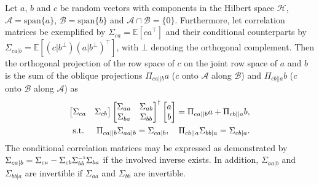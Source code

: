\begin{lem}\label{lem:oblique_projections}\citep[Lemma~1]{VanOverschee1994,Katayama1999} Let $a$, $b$ and $c$ be random vectors with components in the Hilbert space $\mathscr{H}$, $\mathscr{A}=\text{span}\{a\}$, $\mathscr{B}=\text{span}\{b\}$ and $\mathscr{A}\cap\mathscr{B}=\{0\}$. Furthermore, let correlation matrices be exemplified by $\Sigma_{ca}=\mathbb{E}[ca^\top]$ and their conditional counterparts by $\Sigma_{ca|b}=\mathbb{E}[(c|b^\bot)(a|b^\bot)^\top]$, with $\bot$ denoting the orthogonal complement. Then the orthogonal projection of the row space of $c$ on the joint row space of $a$ and $b$ is the sum of the oblique projections $\Pi_{ca||b}a$ ($c$ onto $\mathscr{A}$ along $\mathscr{B}$) and $\Pi_{cb||a}b$ ($c$ onto $\mathscr{B}$ along $\mathscr{A}$) as
\begin{align}
    \begin{bmatrix}
        \Sigma_{ca} & \Sigma_{cb}
    \end{bmatrix}
    \begin{bmatrix}
        \Sigma_{aa} & \Sigma_{ab}\\ \Sigma_{ba} & \Sigma_{bb}
    \end{bmatrix}^\dagger
    \begin{bmatrix}
        a \\ b
    \end{bmatrix} = \Pi_{ca||b} a + \Pi_{cb||a} b,\label{eq:oblique_project}\\
    \text{s.t. }\quad\Pi_{ca||b}\Sigma_{aa|b} = \Sigma_{ca|b},\quad \Pi_{cb||a}\Sigma_{bb|a} = \Sigma_{cb|a}.\notag
\end{align}
The conditional correlation matrices may be expressed as demonstrated by $\Sigma_{ca|b}=\Sigma_{ca}-\Sigma_{cb}\Sigma_{bb}\inv\Sigma_{ba}$ if the involved inverse exists. In addition, $\Sigma_{aa|b}$ and $\Sigma_{bb|a}$ are invertible if $\Sigma_{aa}$ and $\Sigma_{bb}$ are invertible.
\end{lem}

